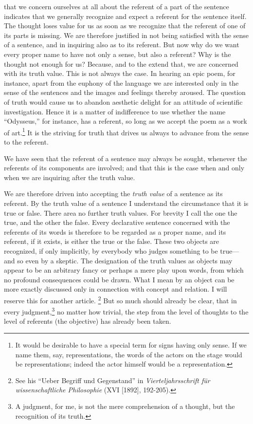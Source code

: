 \documentclass[twoside,12pt,a4paper]{article}
\newcommand{\footnoteAlph}[2][\thefootnote]{%
  \renewcommand{\thefootnote}{\Alph{footnote}}%
  \footnote[#1]{#2}%
  \renewcommand{\thefootnote}{\arabic{footnote}}}
\begin{document}
that we concern ourselves at all about the referent of a part of the
sentence indicates that we generally recognize and expect a referent
for the sentence itself. The thought loses value for us as soon as we
recognize that the referent of one of its parts is missing. We are
therefore justified in not being satisfied with the sense of a
sentence, and in inquiring also as to its referent. But now why do we
want every proper name to have not only a sense, but also a referent?
Why is the thought not enough for us? Because, and to the extend that,
we are concerned with its truth value. This is not always the case. In
hearing an epic poem, for instance, apart from the euphony of the
language we are interested only in the sense of the sentences and the
images and feelings thereby aroused. The question of truth would cause
us to abandon aesthetic delight for an attitude of scientific
investigation. Hence it is a matter of indifference to use whether the
name ``Odysseus,'' for instance, has a referent, so long as we accept
the poem as a work of art.\footnote[6]{It would be desirable to have a
  special term for signs having only sense. If we name them, say,
  representations, the words of the actors on the stage would be
  representations; indeed the actor himself would be a
  representation.} It is the striving for truth that drives us always
to advance from the sense to the referent.

We have seen that the referent of a sentence may always be sought,
whenever the referents of its components are involved; and that this
is the case when and only when we are inquiring after the truth value.

We are therefore driven into accepting the \emph{truth value} of a
sentence as its referent. By the truth value of a sentence I
understand the circumstance that it is true or false. There area no
further truth values. For brevity I call the one the true, and the
other the false. Every declarative sentence concerned with the
referents of its words is therefore to be regarded as a proper name,
and its referent, if it exists, is either the true or the false. These
two objects are recognized, if only implicitly, by everybody who
judges something to be true---and so even by a skeptic. The designation
of the truth values as objects may appear to be an arbitrary fancy or
perhaps a mere play upon words, from which no profound consequences
could be drawn. What I mean by an object can be more exactly discussed
only in connection with concept and relation. I will reserve this for
another article.\footnoteAlph[3]{See his ``Ueber Begriff und
  Gegenstand'' in {\it Vierteljahrsschrift f\"ur wissenschaftliche
    Philosophie} (XVI [1892], 192-205).} But so much should already be
clear, that in every judgment,\footnote[7]{A judgment, for me, is not
  the mere comprehension of a thought, but the recognition of its
  truth.} no matter how trivial, the step from the level of thoughts
to the level of referents (the objective) has already been taken.
\end{document}
